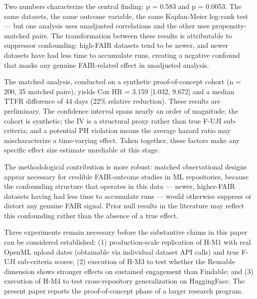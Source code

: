 
Two numbers characterize the central finding: p = 0.583 and p = 0.0053. The same datasets, the same outcome variable, the same Kaplan-Meier log-rank test — but one analysis uses unadjusted correlations and the other uses propensity-matched pairs. The transformation between these results is attributable to suppressor confounding: high-FAIR datasets tend to be newer, and newer datasets have had less time to accumulate runs, creating a negative confound that masks any genuine FAIR-related effect in unadjusted analysis.

The matched analysis, conducted on a synthetic proof-of-concept cohort (n = 200, 35 matched pairs), yields Cox HR = 3.159 [1.032, 9.672] and a median TTFR difference of 44 days (22\% relative reduction). These results are preliminary. The confidence interval spans nearly an order of magnitude; the cohort is synthetic; the IV is a structural proxy rather than true F-UJI sub-criteria; and a potential PH violation means the average hazard ratio may mischaracterize a time-varying effect. Taken together, these factors make any specific effect size estimate unreliable at this stage.

The methodological contribution is more robust: matched observational designs appear necessary for credible FAIR-outcome studies in ML repositories, because the confounding structure that operates in this data — newer, higher-FAIR datasets having had less time to accumulate runs — would otherwise suppress or distort any genuine FAIR signal. Prior null results in the literature may reflect this confounding rather than the absence of a true effect.

Three experiments remain necessary before the substantive claims in this paper can be considered established: (1) production-scale replication of H-M1 with real OpenML upload dates (obtainable via individual dataset API calls) and true F-UJI sub-criteria scores; (2) execution of H-M3 to test whether the Reusable dimension shows stronger effects on sustained engagement than Findable; and (3) execution of H-M4 to test cross-repository generalization on HuggingFace. The present paper reports the proof-of-concept phase of a larger research program.

